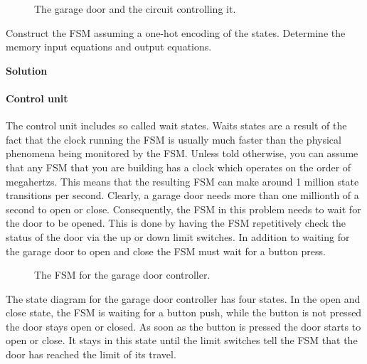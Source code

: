 \begin{enumerate}
        \begin{figure}[ht]
            \caption{The garage door and the circuit controlling it.}
            \label{fig:hwgarage}
        \end{figure}

        Construct the FSM assuming a one-hot encoding of the states.
        Determine the memory input equations and output equations.

        \begin{onlysolution}  \textbf{Solution} \itshape{ \vspace{-1em}
                \paragraph{Control unit}
                The control unit includes so called wait states.  Waits states are
                a result of the fact that the clock running the FSM is usually
                much faster than the physical phenomena being monitored by the FSM.
                Unless told otherwise, you can assume that any FSM that you are
                building has a clock which operates on the order of megahertzs.
                This means that the resulting FSM can make around 1 million
                state transitions per second.  Clearly, a garage door needs more
                than one millionth of a second to open or close.  Consequently,
                the FSM in this problem needs to wait for the door to be opened.
                This is done by having the FSM repetitively check the status of the
                door via the up or down limit switches.  In addition to waiting
                for the garage door to open and close the FSM must wait for a
                button press.

                \begin{figure}[ht]
                    \caption{The FSM for the garage door controller.}
                \end{figure}

                The state diagram for the garage door controller has four states.
                In the open and close state, the FSM is waiting for a button push,
                while the button is not pressed the door stays open or closed.  As
                soon as the button is pressed the door starts to open or close.
                It stays in this state until the limit switches tell the FSM that
                the door has reached the limit of its travel.

}
\end{onlysolution}
\end{enumerate}

